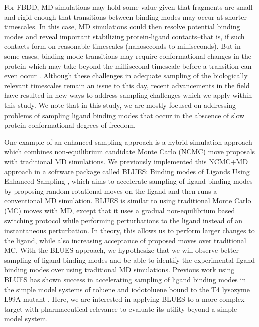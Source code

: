 For FBDD, MD simulations may hold some value given that fragments are small and rigid enough that transitions between binding modes may occur at shorter timescales.
In this case, MD simulations could then resolve potential binding modes and reveal important stabilizing protein-ligand contacts--that is, if such contacts form on reasonable timescales (nanoseconds to milliseconds).
But in some cases, binding mode transitions may require conformational changes in the protein which may take beyond the millisecond timescale before a transition can even occur \cite{schlick_biomolecular_1997,macek_backbone_2007}.
Although these challenges in adequate sampling of the biologically relevant timescales remain an issue to this day, recent advancements in the field have resulted in new ways to address sampling challenges which we apply within this study.
We note that in this study, we are mostly focused on addressing problems of sampling ligand binding modes that occur in the abscence of slow protein conformational degrees of freedom.

One example of an enhanced sampling approach is a hybrid simulation approach which combines non-equilibrium candidate Monte Carlo (NCMC)\cite{ncmc_paper} move proposals with traditional MD simulations.
We previously implemented this NCMC+MD approach in a software package called BLUES: Binding modes of Ligands Using Enhanced Sampling \cite{BLUES_paper}, which aims to accelerate sampling of ligand binding modes by proposing random rotational moves on the ligand and then runs a conventional MD simulation.
BLUES is similar to using traditional Monte Carlo (MC) moves with MD, except that it uses a gradual non-equilibrium based switching protocol while performing perturbations to the ligand instead of an instantaneous perturbation.
In theory, this allows us to perform larger changes to the ligand, while also increasing acceptance of proposed moves over traditional MC.
With the BLUES approach, we hypothesize that we will observe better sampling of ligand binding modes and be able to identify the experimental ligand binding modes over using traditional MD simulations.
Previous work using BLUES has shown success in accelerating sampling of ligand binding modes in the simple model systems of toluene and iodotoluene bound to the T4 lysozyme L99A mutant \cite{BLUES_paper}.
Here, we are interested in applying BLUES to a more complex target with pharmaceutical relevance to evaluate its utility beyond a simple model system.

